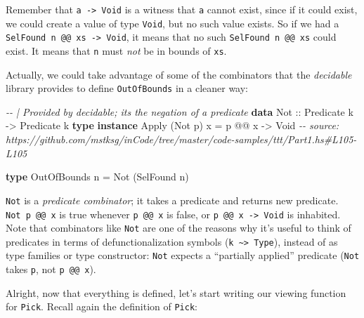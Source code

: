 \documentclass[]{article}
\newenvironment{Shaded}{}{}
\newcommand{\CommentTok}[1]{\textcolor[rgb]{0.38,0.63,0.69}{\textit{#1}}}
\newcommand{\DataTypeTok}[1]{\textcolor[rgb]{0.56,0.13,0.00}{#1}}
\newcommand{\KeywordTok}[1]{\textcolor[rgb]{0.00,0.44,0.13}{\textbf{#1}}}
\newcommand{\NormalTok}[1]{#1}
\newcommand{\OperatorTok}[1]{\textcolor[rgb]{0.40,0.40,0.40}{#1}}
\newcommand{\OtherTok}[1]{\textcolor[rgb]{0.00,0.44,0.13}{#1}}
\begin{document}
Remember that \texttt{a\ -\textgreater{}\ Void} is a witness that \texttt{a}
cannot exist, since if it could exist, we could create a value of type
\texttt{Void}, but no such value exists. So if we had a
\texttt{SelFound\ n\ @@\ xs\ -\textgreater{}\ Void}, it means that no such
\texttt{SelFound\ n\ @@\ xs} could exist. It means that \texttt{n} must
\emph{not} be in bounds of \texttt{xs}.

Actually, we could take advantage of some of the combinators that the
\emph{decidable} library provides to define \texttt{OutOfBounds} in a cleaner
way:

\begin{Shaded}
\begin{Highlighting}[]
\CommentTok{{-}{-} | Provided by decidable; it\textquotesingle{}s the negation of a predicate}
\KeywordTok{data} \DataTypeTok{Not}\OtherTok{ ::} \DataTypeTok{Predicate}\NormalTok{ k }\OtherTok{{-}>} \DataTypeTok{Predicate}\NormalTok{ k}
\KeywordTok{type} \KeywordTok{instance} \DataTypeTok{Apply}\NormalTok{ (}\DataTypeTok{Not}\NormalTok{ p) x }\OtherTok{=}\NormalTok{ p }\OperatorTok{@@}\NormalTok{ x }\OtherTok{{-}>} \DataTypeTok{Void}
\CommentTok{{-}{-} source: https://github.com/mstksg/inCode/tree/master/code{-}samples/ttt/Part1.hs\#L105{-}L105}

\KeywordTok{type} \DataTypeTok{OutOfBounds}\NormalTok{ n }\OtherTok{=} \DataTypeTok{Not}\NormalTok{ (}\DataTypeTok{SelFound}\NormalTok{ n)}
\end{Highlighting}
\end{Shaded}

\texttt{Not} is a \emph{predicate combinator}; it takes a predicate and returns
new predicate. \texttt{Not\ p\ @@\ x} is true whenever \texttt{p\ @@\ x} is
false, or \texttt{p\ @@\ x\ -\textgreater{}\ Void} is inhabited. Note that
combinators like \texttt{Not} are one of the reasons why it's useful to think of
predicates in terms of defunctionalization symbols
(\texttt{k\ \textasciitilde{}\textgreater{}\ Type}), instead of as type families
or type constructor: \texttt{Not} expects a ``partially applied'' predicate
(\texttt{Not} takes \texttt{p}, not \texttt{p\ @@\ x}).

Alright, now that everything is defined, let's start writing our viewing
function for \texttt{Pick}. Recall again the definition of \texttt{Pick}:
\end{document}
